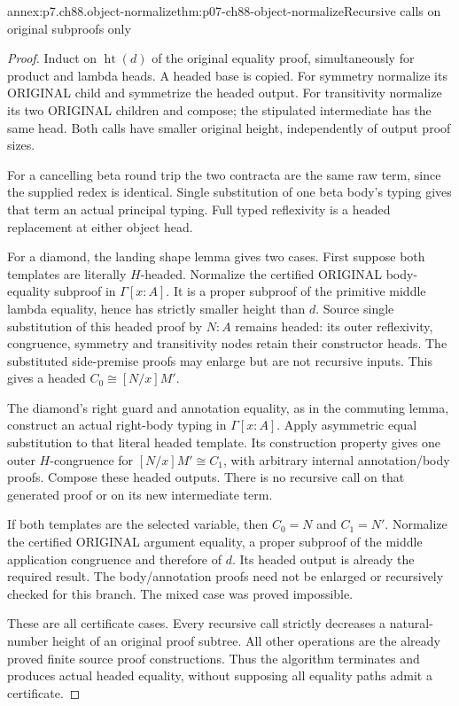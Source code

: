 \begin{annexitem}{annex:p7.ch88.object-normalize}{thm:p07-ch88-object-normalize}{Recursive calls on original subproofs only}
\begin{proof}
Induct on \(\operatorname{ht}(d)\) of the original equality proof,
simultaneously for product and lambda heads. A headed base is copied.
For symmetry normalize its ORIGINAL child and symmetrize the headed
output. For transitivity normalize its two ORIGINAL children and
compose; the stipulated intermediate has the same head. Both calls
have smaller original height, independently of output proof sizes.

For a cancelling beta round trip the two contracta are the same raw
term, since the supplied redex is identical. Single substitution of
one beta body's typing gives that term an actual principal typing.
Full typed reflexivity is a headed replacement at either object head.

For a diamond, the landing shape lemma gives two cases. First suppose
both templates are literally \(H\)-headed. Normalize the certified
ORIGINAL body-equality subproof in \(\Gamma[x:A]\). It is a proper
subproof of the primitive middle lambda equality, hence has strictly
smaller height than \(d\). Source single substitution of this
headed proof by \(N:A\) remains headed: its outer reflexivity,
congruence, symmetry and transitivity nodes retain their constructor
heads. The substituted side-premise proofs may enlarge but are not
recursive inputs. This gives a headed \(C_0\cong[N/x]M'\).

The diamond's right guard and annotation equality, as in the commuting
lemma, construct an actual right-body typing in \(\Gamma[x:A]\).
Apply asymmetric equal substitution to that literal headed template.
Its construction property gives one outer \(H\)-congruence for
\([N/x]M'\cong C_1\), with arbitrary internal annotation/body
proofs. Compose these headed outputs. There is no recursive call
on that generated proof or on its new intermediate term.

If both templates are the selected variable, then \(C_0=N\) and
\(C_1=N'\). Normalize the certified ORIGINAL argument equality,
a proper subproof of the middle application congruence and therefore
of \(d\). Its headed output is already the required result. The
body/annotation proofs need not be enlarged or recursively checked
for this branch. The mixed case was proved impossible.

These are all certificate cases. Every recursive call strictly
decreases a natural-number height of an original proof subtree.
All other operations are the already proved finite source proof
constructions. Thus the algorithm terminates and produces actual
headed equality, without supposing all equality paths admit a certificate.
\end{proof}
\end{annexitem}

